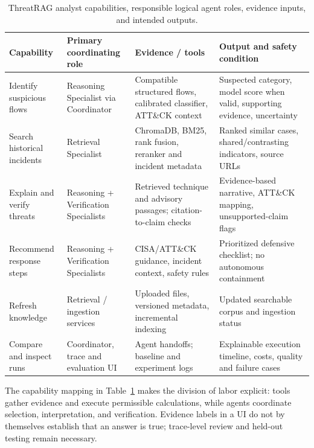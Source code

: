 \documentclass[journal,twoside]{IEEEtran}
\begin{document}
\begin{table}[!t]
\caption{ThreatRAG analyst capabilities, responsible logical agent roles, evidence inputs, and intended outputs.}
\label{tab:capabilities}
\centering\scriptsize
\setlength{\tabcolsep}{4pt}
\begin{tabular}{p{}p{}p{}p{}}
\toprule
Capability & Primary coordinating role & Evidence / tools & Output and safety condition\\\midrule
Identify suspicious flows & Reasoning Specialist via Coordinator & Compatible structured flows, calibrated classifier, ATT\&CK context & Suspected category, model score when valid, supporting evidence, uncertainty\\
Search historical incidents & Retrieval Specialist & ChromaDB, BM25, rank fusion, reranker and incident metadata & Ranked similar cases, shared/contrasting indicators, source URLs\\
Explain and verify threats & Reasoning + Verification Specialists & Retrieved technique and advisory passages; citation-to-claim checks & Evidence-based narrative, ATT\&CK mapping, unsupported-claim flags\\
Recommend response steps & Reasoning + Verification Specialists & CISA/ATT\&CK guidance, incident context, safety rules & Prioritized defensive checklist; no autonomous containment\\
Refresh knowledge & Retrieval / ingestion services & Uploaded files, versioned metadata, incremental indexing & Updated searchable corpus and ingestion status\\
Compare and inspect runs & Coordinator, trace and evaluation UI & Agent handoffs; baseline and experiment logs & Explainable execution timeline, costs, quality and failure cases\\\bottomrule
\end{tabular}
\end{table}

The capability mapping in Table~\ref{tab:capabilities} makes the division of labor explicit: tools gather evidence and execute permissible calculations, while agents coordinate selection, interpretation, and verification. Evidence labels in a UI do not by themselves establish that an answer is true; trace-level review and held-out testing remain necessary.
\end{document}
